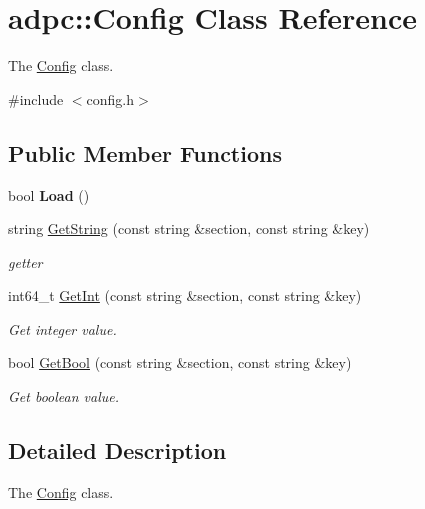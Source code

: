 \hypertarget{classadpc_1_1Config}{}\section{adpc\+:\+:Config Class Reference}
\label{classadpc_1_1Config}


The \hyperlink{classadpc_1_1Config}{Config} class.  




{\ttfamily \#include $<$config.\+h$>$}

\subsection*{Public Member Functions}
\begin{DoxyCompactItemize}
\item 
\mbox{\label{classadpc_1_1Config_a2a68eb461b5842d2a36fbcc5efddaab2}} 
bool {\bfseries Load} ()
\end{DoxyCompactItemize}
\textbf{ }\par
\begin{DoxyCompactItemize}
\item 
string \hyperlink{classadpc_1_1Config_aeb4893a500149d3ae44614767e496132}{Get\+String} (const string \&section, const string \&key)
\begin{DoxyCompactList}\small\item\em getter \end{DoxyCompactList}\item 
int64\+\_\+t \hyperlink{classadpc_1_1Config_a8153d1c7be58fa8ce1a6c768bd65ea94}{Get\+Int} (const string \&section, const string \&key)
\begin{DoxyCompactList}\small\item\em Get integer value. \end{DoxyCompactList}\item 
bool \hyperlink{classadpc_1_1Config_a42a33471c732cd4960e5fb3e00e3b433}{Get\+Bool} (const string \&section, const string \&key)
\begin{DoxyCompactList}\small\item\em Get boolean value. \end{DoxyCompactList}\end{DoxyCompactItemize}



\subsection{Detailed Description}
The \hyperlink{classadpc_1_1Config}{Config} class. 

